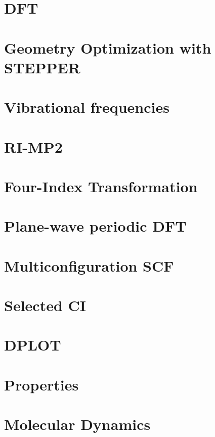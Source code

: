 \section{DFT}


\section{Geometry Optimization with STEPPER}

\section{Vibrational frequencies}


\section{RI-MP2}


\section{Four-Index Transformation} 


\section{Plane-wave periodic DFT}


\section{Multiconfiguration SCF}


\section{Selected CI}


\section{DPLOT}


\section{Properties}


\section{Molecular Dynamics}


